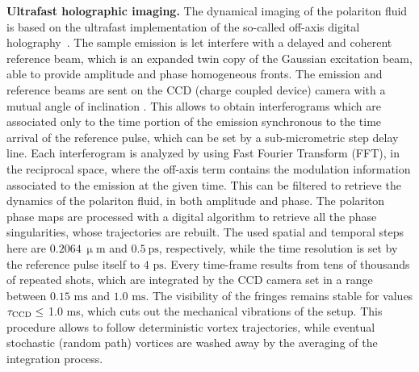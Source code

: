 \documentclass[aps,prb,twocolumn,superscriptaddress,nofootinbib]{revtex4}
\def\editr#1{#1}
\def\edstrike#1{}
\begin{document}
{\noindent \editr{\textbf{Ultrafast holographic imaging.}}
The dynamical imaging of the polariton fluid is based on the ultrafast
implementation of the so-called off-axis digital
holography~\cite{Dominici2014,dominici_real-space_2015,dominici_vortex_2015,gianfrate_superluminal_2018,Anton2012,Nardin2010,Schnars_book2005a}.
The sample emission is let interfere with a delayed
and coherent reference beam, which is an expanded twin copy of the
Gaussian excitation beam, able to provide amplitude and phase homogeneous fronts.
The emission and reference beams are sent on the CCD (charge coupled device) camera with a mutual
angle of inclination \edstrike{($\Delta k$)}.
This allows to obtain interferograms which are associated
only to the time portion of the emission synchronous
to the time arrival of the reference pulse, which can be set by a sub-micrometric step delay line.
Each interferogram is analyzed by using Fast
Fourier Transform (FFT), in the reciprocal space,
where the off-axis term contains the modulation information associated to the emission at the given time.
This can be filtered to retrieve the dynamics of the polariton fluid, in both amplitude and phase.
The polariton phase maps are processed with a digital algorithm to
retrieve all the phase singularities, whose trajectories are rebuilt.
The used spatial and temporal steps here are $0.2064~\upmu\text{m}$ and $0.5~\text{ps}$, respectively,
while the time resolution is set by the reference pulse itself to $4\text{ ps}$.
Every time-frame results from tens of thousands of repeated shots, which are
integrated by the CCD camera set in a range between $0.15\text{ ms}$ and $1.0\text{ ms}$.
The visibility of the fringes remains stable for values $\tau_{\rm CCD} \leq$ 1.0 ms,
 which cuts out the mechanical vibrations of the setup.
This procedure allows to follow deterministic vortex trajectories,
while eventual stochastic (random path) vortices are washed
away by the averaging of the integration process.
\edstrike{Additional details on the technique can be found in Refs.~\cite{Dominici2014,dominici_vortex_2015}.}\\


}
\end{document}
